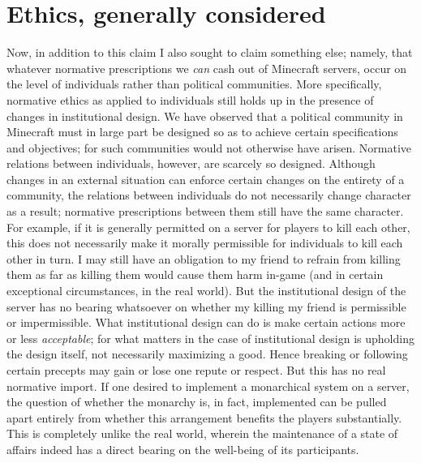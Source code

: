 \section{Ethics, generally considered}
Now, in addition to this claim I also sought to claim something else; namely, that whatever normative prescriptions we \emph{can} cash out of Minecraft servers, occur on the level of individuals rather than political communities. More specifically, normative ethics as applied to individuals still holds up in the presence of changes in institutional design. We have observed that a political community in Minecraft must in large part be designed so as to achieve certain specifications and objectives; for such communities would not otherwise have arisen. Normative relations between individuals, however, are scarcely so designed. Although changes in an external situation can enforce certain changes on the entirety of a community, the relations between individuals do not necessarily change character as a result; normative prescriptions between them still have the same character. For example, if it is generally permitted on a server for players to kill each other, this does not necessarily make it morally permissible for individuals to kill each other in turn. I may still have an obligation to my friend to refrain from killing them as far as killing them would cause them harm in-game (and in certain exceptional circumstances, in the real world). But the institutional design of the server has no bearing whatsoever on whether my killing my friend is permissible or impermissible. What institutional design can do is make certain actions more or less \emph{acceptable}; for what matters in the case of institutional design is upholding the design itself, not necessarily maximizing a good. Hence breaking or following certain precepts may gain or lose one repute or respect. But this has no real normative import. If one desired to implement a monarchical system on a server, the question of whether the monarchy is, in fact, implemented can be pulled apart entirely from whether this arrangement benefits the players substantially. This is completely unlike the real world, wherein the maintenance of a state of affairs indeed has a direct bearing on the well-being of its participants.


